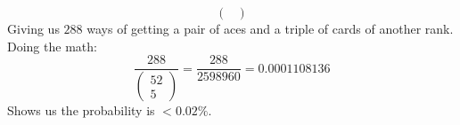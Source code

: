 \documentclass{article}
\begin{document}
\begin{enumerate}[label=\alph*)]
\begin{equation*}
\begin{pmatrix}
        \end{pmatrix}
    \end{equation*}
    Giving us \(288\) ways of getting a pair of aces and a triple of cards of another rank. Doing the math:
    \begin{equation*}
        \frac{288}{
            \begin{pmatrix}
                52 \\
                5
            \end{pmatrix}
        } = \frac{288}{2598960} = 0.0001108136
        \end{equation*}
    Shows us the probability is \(< 0.02\%\).
\end{enumerate}
\end{document}
